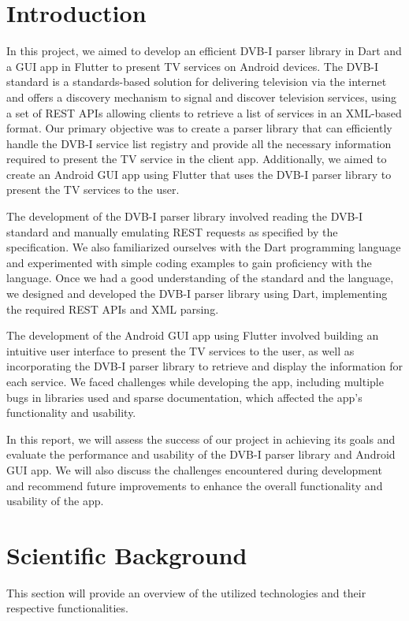 \documentclass[conference]{IEEEtran}
\begin{document}
\section{Introduction}
In this project, we aimed to develop an efficient DVB-I parser library in Dart and a GUI app in Flutter to present TV services on Android devices. The DVB-I standard is a standards-based solution for delivering television via the internet and offers a discovery mechanism to signal and discover television services, using a set of REST APIs allowing clients to retrieve a list of services in an XML-based format. Our primary objective was to create a parser library that can efficiently handle the DVB-I service list registry and provide all the necessary information required to present the TV service in the client app. Additionally, we aimed to create an Android GUI app using Flutter that uses the DVB-I parser library to present the TV services to the user. 

The development of the DVB-I parser library involved reading the DVB-I standard and manually emulating REST requests as specified by the specification. We also familiarized ourselves with the Dart programming language and experimented with simple coding examples to gain proficiency with the language. Once we had a good understanding of the standard and the language, we designed and developed the DVB-I parser library using Dart, implementing the required REST APIs and XML parsing. 

The development of the Android GUI app using Flutter involved building an intuitive user interface to present the TV services to the user, as well as incorporating the DVB-I parser library to retrieve and display the information for each service. We faced challenges while developing the app, including multiple bugs in libraries used and sparse documentation, which affected the app's functionality and usability.

In this report, we will assess the success of our project in achieving its goals and evaluate the performance and usability of the DVB-I parser library and Android GUI app. We will also discuss the challenges encountered during development and recommend future improvements to enhance the overall functionality and usability of the app.

\section{Scientific Background}

This section will provide an overview of the utilized technologies and their respective functionalities.
\end{document}
